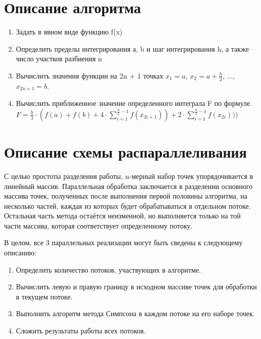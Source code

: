 \documentclass[14pt, a4paper]{extarticle}
\begin{document}
  \section{Описание алгоритма}

  \begin{enumerate}
    \item Задать в явном виде функцию f(x)
      
     \item Определить пределы интегрирования а, b и шаг интегрирования h, а также число участков разбиения n

     \item Вычислить значения функции на 2n + 1 точках $x_{1} = a$, $x_{2} = a + \frac{h}{2}$, ..., $x_{2n + 1} = b$.
        
    \item Вычислить приближенное значение определенного интеграла F по формуле.
    $F = \frac{h}{3}\cdot(f(a) + f(b) + 4\cdot\sum\limits_{i=1}^{\frac{n}{2} - 1}f(x_{2i + 1})) + 2\cdot\sum\limits_{i=1}^{\frac{n}{2} - 1}f(x_{2i})))$
  \end{enumerate}
  \newpage

  \section{Описание схемы распараллеливания}
С целью простоты разделения работы, n-мерный набор точек упорядочивается в линейный массив.
Параллельная обработка заключается в разделении основного массива точек, полученных после выполнения первой половины алгоритма, на несколько частей, каждая из которых будет обрабатываться в отдельном потоке. Остальная часть метода остаётся неизменной, но выполняется только на той части массива, которая соответствует определенному потоку.

В целом, все 3 параллельных реализации могут быть сведены к следующему описанию:
  \begin{enumerate}
    \item Определить количество потоков, участвующих в алгоритме.
    \item Вычислить левую и правую границу в исходном массиве точек для обработки в текущем потоке.
    \item Выполнить алгоритм метода Симпсона в каждом потоке на его наборе точек.
    \item Сложить результаты работы всех потоков.
  \end{enumerate}


  \newpage
\end{document}

